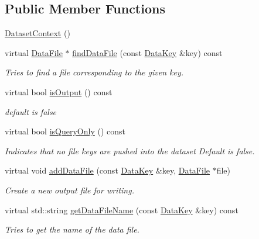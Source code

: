 \subsection*{Public Member Functions}
\begin{DoxyCompactItemize}
\item 
\hyperlink{classBUSBOY_1_1DatasetContext_a933c6f2a96c8ed5c9219b1a6dcc3618d}{DatasetContext} ()
\item 
virtual \hyperlink{classBUSBOY_1_1DataFile}{DataFile} $\ast$ \hyperlink{classBUSBOY_1_1DatasetContext_a37fe67fa469141703703e7eee9c50a14}{findDataFile} (const \hyperlink{classBUSBOY_1_1DataKey}{DataKey} \&key) const 
\begin{DoxyCompactList}\small\item\em Tries to find a file corresponding to the given key. \item\end{DoxyCompactList}\item 
virtual bool \hyperlink{classBUSBOY_1_1DatasetContext_a25d929ed419ebb4c006d4926f53f504e}{isOutput} () const 
\begin{DoxyCompactList}\small\item\em default is false \item\end{DoxyCompactList}\item 
virtual bool \hyperlink{classBUSBOY_1_1DatasetContext_a934ce529a4ae4cced154260714bbd380}{isQueryOnly} () const 
\begin{DoxyCompactList}\small\item\em Indicates that no file keys are pushed into the dataset Default is false. \item\end{DoxyCompactList}\item 
virtual void \hyperlink{classBUSBOY_1_1DatasetContext_a76ffe901522f6cfc86a09ed3e5087abb}{addDataFile} (const \hyperlink{classBUSBOY_1_1DataKey}{DataKey} \&key, \hyperlink{classBUSBOY_1_1DataFile}{DataFile} $\ast$file)
\begin{DoxyCompactList}\small\item\em Create a new output file for writing. \item\end{DoxyCompactList}\item 
virtual std::string \hyperlink{classBUSBOY_1_1DatasetContext_ae85935dfaf6cb24e10e69f3d466c6699}{getDataFileName} (const \hyperlink{classBUSBOY_1_1DataKey}{DataKey} \&key) const 
\begin{DoxyCompactList}\small\item\em Tries to get the name of the data file. \item\end{DoxyCompactList}\item 

\end{DoxyCompactItemize}
